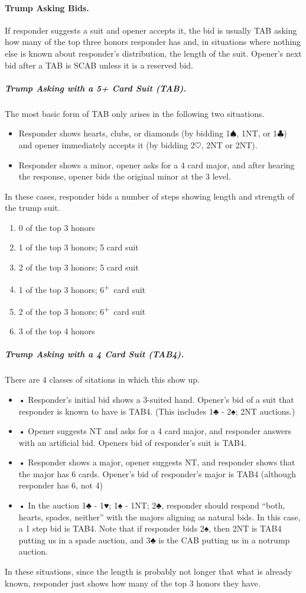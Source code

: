 \documentclass[10pt]{article}
\renewcommand{\c}{$\clubsuit$}
\newcommand{\h}{$\heartsuit$}
\newcommand{\s}{$\spadesuit$}
\newcommand{\p}{\textsuperscript{+}}
\begin{document}
\begin{multicols*}{2}
\paragraph{Trump Asking Bids.}

If responder suggests a suit and opener accepts it, the bid is usually TAB
asking how many of the top three honors responder has and, in situations where
nothing else is known about responder’s distribution, the length of the suit.
Opener’s next bid after a TAB is SCAB unless it is a reserved bid.

\subparagraph{Trump Asking with a 5+ Card Suit (TAB).}

The most basic form of TAB only arises in the following two situations.
\begin{itemize}
\item Responder shows hearts, clubs, or diamonds (by bidding 1\s, 1NT, or 1\c) and
  opener immediately accepts it (by bidding 2\h, 2NT or 2NT).
\item Responder shows a minor, opener asks for a 4 card major, and after hearing
  the response, opener bids the original minor at the 3 level.
\end{itemize}
In these cases, responder bids a number of steps showing length and strength of the trump suit.
\begin{enumerate}
\item 0 of the top 3 honors
\item 1 of the top 3 honors; 5 card suit
\item 2 of the top 3 honors; 5 card suit
\item 1 of the top 3 honors; 6\p\ card suit
\item 2 of the top 3 honors; 6\p\ card suit
\item 3 of the top 4 honors
\end{enumerate}

\subparagraph{Trump Asking with a 4 Card Suit (TAB4).}

 There are 4 classes of sitations
in which this show up.
\begin{itemize}
\item • Responder’s initial bid shows a 3-suited hand. Opener’s bid of a suit
  that responder is known to have is TAB4. (This includes 1♣ - 2♠; 2NT
  auctions.)
\item • Opener suggests NT and asks for a 4 card major, and responder answers
  with an artificial bid. Openers bid of responder’s suit is TAB4.
\item • Responder shows a major, opener suggests NT, and responder shows that
  the major has 6 cards. Opener’s bid of responder’s major is TAB4 (although
  responder has 6, not 4)
\item • In the auction 1♣ - 1♥; 1♠ - 1NT; 2♣, responder should respond “both,
  hearts, spades, neither” with the majors aligning as natural bids. In this
  case, a 1 step bid is TAB4. Note that if responder bids 2♠, then 2NT is TAB4
  putting us in a spade auction, and 3♣ is the CAB putting us in a notrump
  auction.
\end{itemize}
In these situations, since the length is probably not longer that what is already
known, responder just shows how many of the top 3 honors they have.


\end{multicols*}
\end{document}
